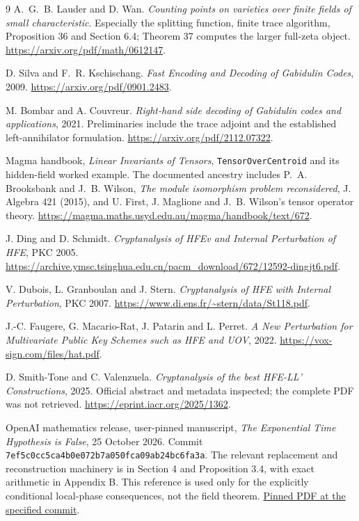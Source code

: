 \documentclass[11pt]{article}
\theoremstyle{remark}\newtheorem{remark}[theorem]{Remark}
\begin{document}
{\small
\begin{thebibliography}{9}
\setlength{\itemsep}{1pt}
\setlength{\parskip}{0pt}
A.~G.~B. Lauder and D. Wan.
\emph{Counting points on varieties over finite fields of small characteristic}.
Especially the splitting function, finite trace algorithm, Proposition 36 and Section 6.4; Theorem 37 computes the larger full-zeta object.
\url{https://arxiv.org/pdf/math/0612147}.

D. Silva and F.~R. Kschischang.
\emph{Fast Encoding and Decoding of Gabidulin Codes}, 2009.
\url{https://arxiv.org/pdf/0901.2483}.

M. Bombar and A. Couvreur.
\emph{Right-hand side decoding of Gabidulin codes and applications}, 2021.
Preliminaries include the trace adjoint and the established left-annihilator formulation.
\url{https://arxiv.org/pdf/2112.07322}.

Magma handbook, \emph{Linear Invariants of Tensors},
\texttt{TensorOverCentroid} and its hidden-field worked example.
The documented ancestry includes P.~A. Brooksbank and J.~B. Wilson,
\emph{The module isomorphism problem reconsidered}, J. Algebra 421 (2015),
and U. First, J. Maglione and J.~B. Wilson's tensor operator theory.
\url{https://magma.maths.usyd.edu.au/magma/handbook/text/672}.

J. Ding and D. Schmidt.
\emph{Cryptanalysis of HFEv and Internal Perturbation of HFE}, PKC 2005.
\url{https://archive.ymsc.tsinghua.edu.cn/pacm_download/672/12592-dingjt6.pdf}.

V. Dubois, L. Granboulan and J. Stern.
\emph{Cryptanalysis of HFE with Internal Perturbation}, PKC 2007.
\url{https://www.di.ens.fr/~stern/data/St118.pdf}.

J.-C. Faugere, G. Macario-Rat, J. Patarin and L. Perret.
\emph{A New Perturbation for Multivariate Public Key Schemes such as HFE and UOV}, 2022.
\url{https://vox-sign.com/files/hat.pdf}.

D. Smith-Tone and C. Valenzuela.
\emph{Cryptanalysis of the best HFE-LL' Constructions}, 2025.
Official abstract and metadata inspected; the complete PDF was not retrieved.
\url{https://eprint.iacr.org/2025/1362}.

OpenAI mathematics release, user-pinned manuscript,
\emph{The Exponential Time Hypothesis is False}, 25 October 2026.
Commit \texttt{7ef5c0cc5ca4b0e072b7a050fca09ab24bc6fa3a}.
The relevant replacement and reconstruction machinery is in Section 4 and Proposition 3.4, with exact arithmetic in Appendix B. This reference is used only for the explicitly conditional local-phase consequences, not the field theorem.
\href{https://github.com/openai/math/blob/7ef5c0cc5ca4b0e072b7a050fca09ab24bc6fa3a/preprints/The-Exponential-Time-Hypothesis-is-False-October-25-2026/paper.pdf}{Pinned PDF at the specified commit}.
\end{thebibliography}
}
\end{document}
